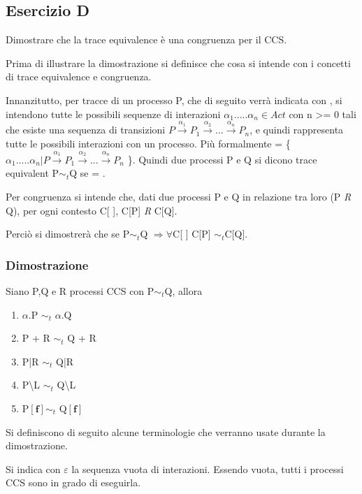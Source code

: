 \pagebreak
\subsection{Esercizio D} 
Dimostrare che la trace equivalence è una congruenza per il CCS.

Prima di illustrare la dimostrazione si definisce che cosa si intende con i concetti di trace equivalence e congruenza.

Innanzitutto, per tracce di un processo P, che di seguito verrà indicata con , si intendono tutte le possibili sequenze di interazioni $\alpha_{1}.....\alpha_{n} \in Act$ con n >= 0 tali che esiste una sequenza di transizioni $P \overset{\alpha_{1}}\rightarrow P_{1} \overset{\alpha_{2}}\rightarrow...\overset{\alpha_{n}}\rightarrow P_{n}$, e quindi rappresenta tutte le possibili interazioni con un processo. Più formalmente  = \{ $\alpha_{1}.....\alpha_{n} | P \overset{\alpha_{1}}\rightarrow P_{1} \overset{\alpha_{2}}\rightarrow...\overset{\alpha_{n}}\rightarrow P_{n}$ \}. Quindi due processi P e Q si dicono trace equivalent P$\sim_{t}$Q se  = .

Per congruenza si intende che, dati due processi P e Q in relazione tra loro (P \textit{R} Q), per ogni contesto C[ ], C[P] \textit{R} C[Q]. 

Perciò si dimostrerà che se P$\sim_{t}$Q $\Rightarrow \forall$C[ ] C[P] $\sim_{t}$C[Q].

\subsubsection{Dimostrazione} 

Siano P,Q e R processi CCS con P$\sim_{t}$Q, allora 

\begin{enumerate}
	\item $\alpha$.P $\sim_{t}$ $\alpha$.Q
	\item P + R $\sim_{t}$ Q + R
	\item P|R $\sim_{t}$ Q|R
	\item P\textbackslash L $\sim_{t}$ Q\textbackslash L
	\item P$\mathbf{[f]}\sim_{t}$ Q$\mathbf{[f]}$
\end{enumerate}

Si definiscono di seguito alcune terminologie che verranno usate durante la dimostrazione.

Si indica con $\varepsilon$ la sequenza vuota di interazioni. Essendo vuota, tutti i processi CCS sono in grado di eseguirla.

